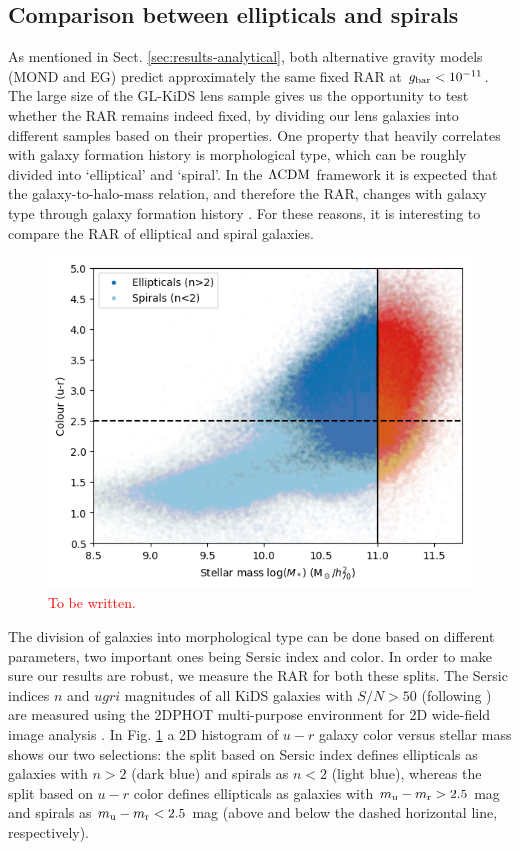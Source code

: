 \documentclass[usenatbib]{mnras}
\newcommand{\lcdm}{{\rm \Lambda CDM}}
\newcommand{\un}[1]{_{\rm #1}}
\begin{document}
\subsection{Comparison between ellipticals and spirals}
\label{sec:results-types}

As mentioned in Sect. \ref{sec:results-analytical}, both alternative gravity models (MOND and EG) predict approximately the same fixed RAR at $g\un{bar}<10^{-11}$. The large size of the GL-KiDS lens sample gives us the opportunity to test whether the RAR remains indeed fixed, by dividing our lens galaxies into different samples based on their properties. One property that heavily correlates with galaxy formation history is morphological type, which can be roughly divided into `elliptical' and `spiral'. In the $\lcdm$ framework it is expected that the galaxy-to-halo-mass relation, and therefore the RAR, changes with galaxy type through galaxy formation history \cite[]{matthee2017,posti2019,marasco2020}. For these reasons, it is interesting to compare the RAR of elliptical and spiral galaxies.


\begin{figure}
	\includegraphics[width=\columnwidth]{Figures/galaxy_morphology_color_u-r.png}
	\caption{\textcolor{red}{To be written.}}
	\label{fig:galtypes_scatterplot}
\end{figure}

The division of galaxies into morphological type can be done based on different parameters, two important ones being Sersic index and color. In order to make sure our results are robust, we measure the RAR for both these splits. The Sersic indices $n$ and $ugri$ magnitudes of all KiDS galaxies with $S/N > 50$ (following \cite{roy2018}) are measured using the 2DPHOT multi-purpose environment for 2D wide-field image analysis \cite[]{barbera2008}. In Fig. \ref{fig:galtypes_scatterplot} a 2D histogram of $u-r$ galaxy color versus stellar mass shows our two selections: the split based on Sersic index defines ellipticals as galaxies with $n > 2$ (dark blue) and spirals as $n<2$ (light blue), whereas the split based on $u-r$ color defines ellipticals as galaxies with $m\un{u} - m\un{r} > 2.5$ mag and spirals as $m\un{u} - m\un{r} < 2.5$ mag (above and below the dashed horizontal line, respectively).
\end{document}
